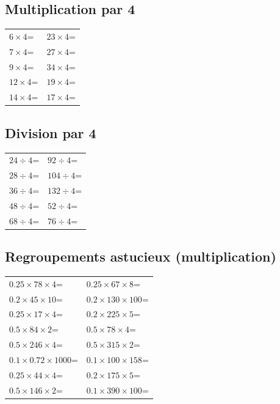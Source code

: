 \documentclass[answers]{exam}
\newcommand{\ex}[1]{#1\;=\;\dotfill}
\begin{document}
\subsection*{Multiplication par 4}
\begin{center}
\begin{tabular}{|L|L|}
\hline
\ex{$6\times4$} & \ex{$23\times4$} \\
\ex{$7\times4$} & \ex{$27\times4$} \\
\ex{$9\times4$} & \ex{$34\times4$} \\
\ex{$12\times4$} & \ex{$19\times4$} \\
\ex{$14\times4$} & \ex{$17\times4$} \\
\hline
\end{tabular}
\end{center}

\subsection*{Division par 4}
\begin{center}
\begin{tabular}{|L|L|}
\hline
\ex{$24\div4$} & \ex{$92\div4$} \\
\ex{$28\div4$} & \ex{$104\div4$} \\
\ex{$36\div4$} & \ex{$132\div4$} \\
\ex{$48\div4$} & \ex{$52\div4$} \\
\ex{$68\div4$} & \ex{$76\div4$} \\
\hline
\end{tabular}
\end{center}

\subsection*{Regroupements astucieux (multiplication)}
\begin{center}
\begin{tabular}{|L|L|}
\hline
\ex{$0.25\times78\times4$} & \ex{$0.25\times67\times8$} \\
\ex{$0.2\times45\times10$} & \ex{$0.2\times130\times100$} \\
\ex{$0.25\times17\times4$} & \ex{$0.2\times225\times5$} \\
\ex{$0.5\times84\times2$} & \ex{$0.5\times78\times4$} \\
\ex{$0.5\times246\times4$} & \ex{$0.5\times315\times2$} \\
\ex{$0.1\times0.72\times1000$} & \ex{$0.1\times100\times158$} \\
\ex{$0.25\times44\times4$} & \ex{$0.2\times175\times5$} \\
\ex{$0.5\times146\times2$} & \ex{$0.1\times390\times100$} \\
\hline
\end{tabular}
\end{center}
\end{document}
